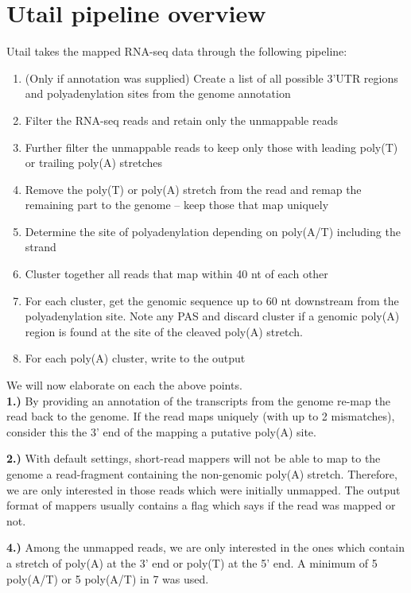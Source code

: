 %

\section{Utail pipeline overview}

Utail takes the mapped RNA-seq data through the following pipeline:
\begin{enumerate}
	\item (Only if annotation was supplied) Create a list of all possible
		3'UTR regions and polyadenylation sites from the genome annotation
	\item Filter the RNA-seq reads and retain only the unmappable reads
	\item Further filter the unmappable reads to keep only those with leading
		poly(T) or trailing poly(A) stretches
	\item Remove the poly(T) or poly(A) stretch from the read and remap the
		remaining part to the genome -- keep those that map uniquely
	\item Determine the site of polyadenylation depending on poly(A/T)
		including the strand
	\item Cluster together all reads that map within 40 nt of each other
	\item For each cluster, get the genomic sequence up to 60 nt downstream
		from the polyadenylation site. Note any PAS and discard cluster if a
		genomic poly(A) region is found at the site of the cleaved poly(A)
		stretch.
	\item For each poly(A) cluster, write to the output
\end{enumerate}
We will now elaborate on each the above points.\\

\textbf{1.)} By providing an annotation of the transcripts from the genome
re-map the read back to the genome. If the read maps uniquely (with up to 2
mismatches), consider this the 3' end of the mapping a putative poly(A) site.

\textbf{2.)} With default settings, short-read mappers will not be able to map
to the genome a read-fragment containing the non-genomic poly(A)
stretch. Therefore, we are only interested in those reads which were initially
unmapped. The output format of mappers usually contains a flag which says if
the read was mapped or not.

\textbf{4.)} Among the unmapped reads, we are only interested in the ones which
contain a stretch of poly(A) at the 3' end or poly(T) at the 5' end. A minimum
of 5 poly(A/T) or 5 poly(A/T) in 7 was used.

